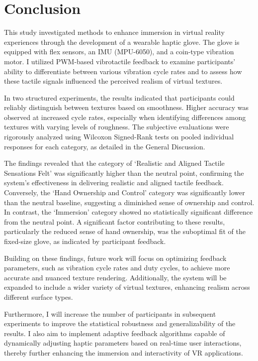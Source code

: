 \chapter{Conclusion} %

\label{Chapter6}

This study investigated methods to enhance immersion in virtual reality experiences through the development of a wearable haptic glove. The glove is equipped with flex sensors, an IMU (MPU-6050), and a coin-type vibration motor. I utilized PWM-based vibrotactile feedback to examine participants' ability to differentiate between various vibration cycle rates and to assess how these tactile signals influenced the perceived realism of virtual textures.


In two structured experiments, the results indicated that participants could reliably distinguish between textures based on smoothness. Higher accuracy was observed at increased cycle rates, especially when identifying differences among textures with varying levels of roughness. The subjective evaluations were rigorously analyzed using Wilcoxon Signed-Rank tests on pooled individual responses for each category, as detailed in the General Discussion. 

The findings revealed that the category of `Realistic and Aligned Tactile Sensations Felt' was significantly higher than the neutral point, confirming the system's effectiveness in delivering realistic and aligned tactile feedback. Conversely, the `Hand Ownership and Control' category was significantly lower than the neutral baseline, suggesting a diminished sense of ownership and control. In contrast, the `Immersion' category showed no statistically significant difference from the neutral point. A significant factor contributing to these results, particularly the reduced sense of hand ownership, was the suboptimal fit of the fixed-size glove, as indicated by participant feedback.

Building on these findings, future work will focus on optimizing feedback parameters, such as vibration cycle rates and duty cycles, to achieve more accurate and nuanced texture rendering. Additionally, the system will be expanded to include a wider variety of virtual textures, enhancing realism across different surface types. 

Furthermore, I will increase the number of participants in subsequent experiments to improve the statistical robustness and generalizability of the results. I also aim to implement adaptive feedback algorithms capable of dynamically adjusting haptic parameters based on real-time user interactions, thereby further enhancing the immersion and interactivity of VR applications.





